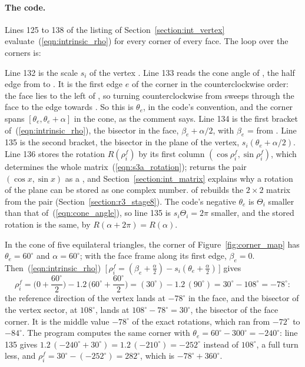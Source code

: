 \paragraph{The code.} Lines 125 to 138 of the listing of Section~\ref{section:int_vertex} evaluate~(\ref{eqn:intrinsic_rho}) for every corner of every face. The loop over the corners is:

Line 132 is the scale $s_i$ of the vertex . Line 133 reads the cone angle of , the half edge from  to . It is the first edge $e$ of the corner in the counterclockwise order: the face lies to the left of , so turning counterclockwise from  sweeps through the face to the edge towards . So this is $\theta_e$, in the code's convention, and the corner spans $[\theta_e, \theta_e + \alpha]$ in the cone, as the comment says. Line 134 is the first bracket of~(\ref{eqn:intrinsic_rho}), the bisector in the face, $\beta_e + \alpha/2$, with $\beta_e$ =  from . Line 135 is the second bracket, the bisector in the plane of the vertex, $s_i(\theta_e + \alpha/2)$. Line 136 stores the rotation $R(\rho_i^f)$ by its first column $(\cos\rho_i^f, \sin\rho_i^f)$, which determines the whole matrix~(\ref{eqn:s3a_rotation});  returns the pair $(\cos x, \sin x)$ as a , and Section~\ref{section:int_matrix} explains why a rotation of the plane can be stored as one complex number.  of  rebuilds the $2 \times 2$ matrix from the pair (Section~\ref{section:r3_stage8}). The code's negative $\theta_e$ is $\Theta_i$ smaller than that of~(\ref{eqn:cone_angle}), so line 135 is $s_i\Theta_i = 2\pi$ smaller, and the stored rotation is the same, by $R(\alpha + 2\pi) = R(\alpha)$.

\begin{example}
\label{ex:int_rho}
In the cone of five equilateral triangles, the corner of Figure~\ref{fig:corner_map} has $\theta_e = 60^\circ$ and $\alpha = 60^\circ$; with the face frame along its first edge, $\beta_e = 0$. Then~(\ref{eqn:intrinsic_rho})~[\,$\rho_i^f = (\beta_e + \tfrac\alpha2) - s_i(\theta_e + \tfrac\alpha2)$\,] gives
\begin{equation*}
\rho_i^f = \Big(0 + \frac{60^\circ}{2}\Big) - 1.2\,\Big(60^\circ + \frac{60^\circ}{2}\Big) = (30^\circ) - 1.2\,(90^\circ) = 30^\circ - 108^\circ = -78^\circ :
\end{equation*}
the reference direction of the vertex lands at $-78^\circ$ in the face, and the bisector of the vertex sector, at $108^\circ$, lands at $108^\circ - 78^\circ = 30^\circ$, the bisector of the face corner. It is the middle value $-78^\circ$ of the exact rotations, which ran from $-72^\circ$ to $-84^\circ$. The program computes the same corner with $\theta_e = 60^\circ - 300^\circ = -240^\circ$: line 135 gives $1.2\,(-240^\circ + 30^\circ) = 1.2\,(-210^\circ) = -252^\circ$ instead of $108^\circ$, a full turn less, and $\rho_i^f = 30^\circ - (-252^\circ) = 282^\circ$, which is $-78^\circ + 360^\circ$.
\end{example}

